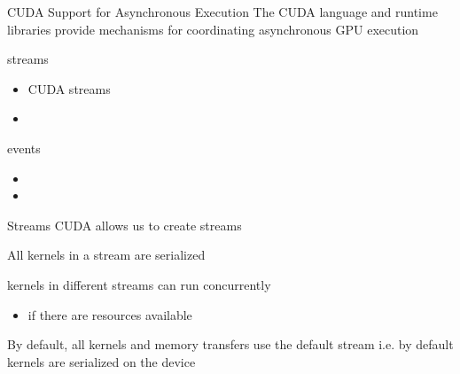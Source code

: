 \begin{frame}[fragile]{CUDA Support for Asynchronous Execution}
    The CUDA language and runtime libraries provide mechanisms for coordinating asynchronous GPU execution

    \begin{info}{streams}
        \begin{itemize}
            \item CUDA streams 
            \item
        \end{itemize}
    \end{info}

    \begin{info}{events}
        \begin{itemize}
            \item
            \item
        \end{itemize}
    \end{info}
\end{frame}

\begin{frame}[fragile]{Streams}
    CUDA allows us to create streams

    All kernels in a stream are serialized

    kernels in different streams can run concurrently
    \begin{itemize}
        \item if there are resources available
    \end{itemize}

    By default, all kernels and memory transfers use the default stream
    i.e. by default kernels are serialized on the device
\end{frame}

